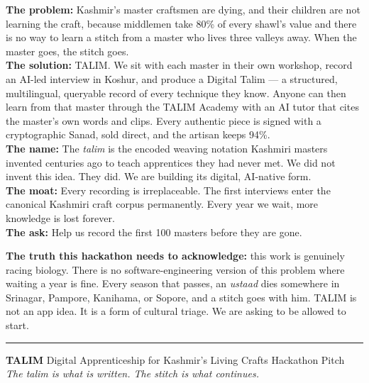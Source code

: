 \documentclass[11pt, a4paper]{article}
\begin{document}
\begin{insightbox}
\textbf{The problem:} Kashmir's master craftsmen are dying, and their children are not learning the craft, because middlemen take 80\% of every shawl's value and there is no way to learn a stitch from a master who lives three valleys away. When the master goes, the stitch goes.\\[5pt]
\textbf{The solution:} TALIM. We sit with each master in their own workshop, record an AI-led interview in Koshur, and produce a Digital Talim — a structured, multilingual, queryable record of every technique they know. Anyone can then learn from that master through the TALIM Academy with an AI tutor that cites the master's own words and clips. Every authentic piece is signed with a cryptographic Sanad, sold direct, and the artisan keeps 94\%.\\[5pt]
\textbf{The name:} The {\itshape talim} is the encoded weaving notation Kashmiri masters invented centuries ago to teach apprentices they had never met. We did not invent this idea. They did. We are building its digital, AI-native form.\\[5pt]
\textbf{The moat:} Every recording is irreplaceable. The first interviews enter the canonical Kashmiri craft corpus permanently. Every year we wait, more knowledge is lost forever.\\[5pt]
\textbf{The ask:} Help us record the first 100 masters before they are gone.
\end{insightbox}

\smallskip

\begin{warnbox}
\textbf{The truth this hackathon needs to acknowledge:} this work is genuinely racing biology. There is no software-engineering version of this problem where waiting a year is fine. Every season that passes, an {\itshape ustaad} dies somewhere in Srinagar, Pampore, Kanihama, or Sopore, and a stitch goes with him. TALIM is not an app idea. It is a form of cultural triage. We are asking to be allowed to start.
\end{warnbox}

\vspace{0.6em}

\noindent\color{rule}\rule{\linewidth}{1pt}

\begin{center}
\small\color{muted}
\textbf{TALIM} \;\textbar\; Digital Apprenticeship for Kashmir's Living Crafts \;\textbar\; Hackathon Pitch \;\textbar{}\\[3pt]
\itshape The talim is what is written. The stitch is what continues.
\end{center}
\end{document}

